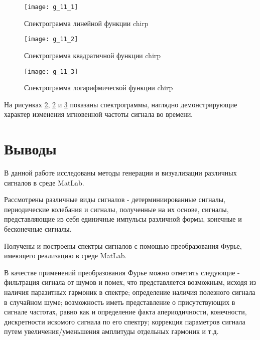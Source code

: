 \begin{figure}[H]
	\begin{center}
		\texttt{[image: g\_11\_1]}
		\caption{Спектрограмма линейной функции chirp} 
		\label{pic:g_11_1} %
	\end{center}
\end{figure}
\begin{figure}[H]
	\begin{center}
		\texttt{[image: g\_11\_2]}
		\caption{Спектрограмма квадратичной функции chirp} 
		\label{pic:g_11_2} %
	\end{center}
\end{figure}
\begin{figure}[H]
	\begin{center}
		\texttt{[image: g\_11\_3]}
		\caption{Спектрограмма логарифмической функции chirp} 
		\label{pic:g_11_3} %
	\end{center}
\end{figure}
На рисунках \ref{pic:g_11_2}, \ref{pic:g_11_2} и \ref{pic:g_11_3} показаны спектрограммы, наглядно демонстрирующие характер изменения мгновенной частоты сигнала во времени.

\section{Выводы}

В данной работе исследованы методы генерации и визуализации различных сигналов в среде MatLab. 

Рассмотрены различные виды сигналов - детерминиированные сигналы, периодические колебания и сигналы, полученные на их основе, сигналы, представляющие из себя единичные импульсы различной формы, конечные и бесконечные сигналы.

Получены и построены спектры сигналов с помощью преобразования Фурье, имеющего реализацию в среде MatLab.

В качестве применений преобразования Фурье можно отметить следующие - фильтрация сигнала от шумов и помех, что представляется возможным, исходя из наличия паразитных гармоник в спектре; определение наличия полезного сигнала в случайном шуме; возможность иметь представление о присутствующих в сигнале частотах, равно как и определение факта апериодичности, конечности, дискретности искомого сигнала по его спектру; коррекция параметров сигнала путем увеличения/уменьшения амплитуды отдельных гармоник и т.д.


